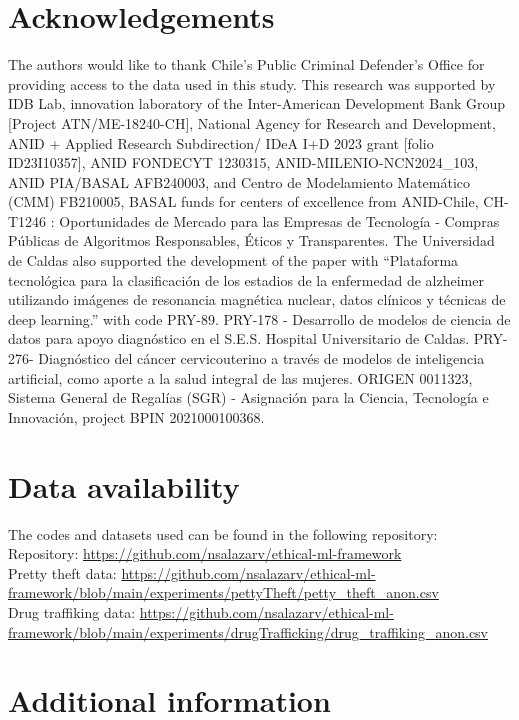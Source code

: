 \documentclass[fleqn,10pt]{wlscirep}
\begin{document}
\section*{Acknowledgements}

The authors would like to thank Chile's Public Criminal Defender’s Office for providing access to the data used in this study. This research was supported by IDB Lab, innovation laboratory of the Inter-American Development Bank Group [Project ATN/ME-18240-CH], National Agency for Research and Development, ANID + Applied Research Subdirection/ IDeA I+D 2023 grant [folio ID23I10357], ANID FONDECYT 1230315, ANID-MILENIO-NCN2024\_103, ANID PIA/BASAL AFB240003, and Centro de Modelamiento Matemático (CMM) FB210005, BASAL funds for centers of excellence from ANID-Chile, CH-T1246 : Oportunidades de Mercado para las Empresas de Tecnología - Compras Públicas de Algoritmos Responsables, Éticos y Transparentes. The Universidad de Caldas also supported the development of the paper with “Plataforma tecnológica para la clasificación de los estadios de la enfermedad de alzheimer utilizando imágenes de resonancia magnética nuclear, datos clínicos y técnicas de deep learning.” with code PRY-89. PRY-178 - Desarrollo de modelos de ciencia de datos para apoyo diagnóstico en el S.E.S. Hospital Universitario de Caldas. PRY-276- Diagnóstico del cáncer cervicouterino a través de modelos de inteligencia artificial, como aporte a la salud integral de las mujeres. ORIGEN 0011323, Sistema General de Regalías (SGR) - Asignación para la Ciencia, Tecnología e Innovación, project BPIN 2021000100368.

\section*{Data availability}
The codes and datasets used can be found in the following repository: \\
Repository: \url{https://github.com/nsalazarv/ethical-ml-framework}
\\Pretty theft data: \url{https://github.com/nsalazarv/ethical-ml-framework/blob/main/experiments/pettyTheft/petty_theft_anon.csv}
\\ Drug traffiking data: \url{https://github.com/nsalazarv/ethical-ml-framework/blob/main/experiments/drugTrafficking/drug_traffiking_anon.csv}

\clearpage

\section*{Additional information}
\end{document}
